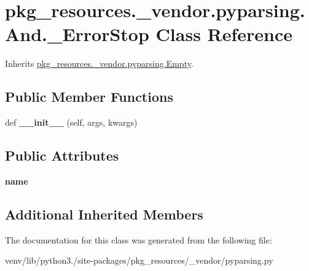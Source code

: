 \hypertarget{classpkg__resources_1_1__vendor_1_1pyparsing_1_1_and_1_1___error_stop}{}\section{pkg\+\_\+resources.\+\_\+vendor.\+pyparsing.\+And.\+\_\+\+Error\+Stop Class Reference}
\label{classpkg__resources_1_1__vendor_1_1pyparsing_1_1_and_1_1___error_stop}


Inherits \hyperlink{classpkg__resources_1_1__vendor_1_1pyparsing_1_1_empty}{pkg\+\_\+resources.\+\_\+vendor.\+pyparsing.\+Empty}.

\subsection*{Public Member Functions}
\begin{DoxyCompactItemize}
\item 
\mbox{\label{classpkg__resources_1_1__vendor_1_1pyparsing_1_1_and_1_1___error_stop_a332d54174e10c8ecf9c328ba395cab14}} 
def {\bfseries \+\_\+\+\_\+init\+\_\+\+\_\+} (self, args, kwargs)
\end{DoxyCompactItemize}
\subsection*{Public Attributes}
\begin{DoxyCompactItemize}
\item 
\mbox{\label{classpkg__resources_1_1__vendor_1_1pyparsing_1_1_and_1_1___error_stop_a424f6e8180b4d33396c48f8bca657631}} 
{\bfseries name}
\end{DoxyCompactItemize}
\subsection*{Additional Inherited Members}


The documentation for this class was generated from the following file\+:\begin{DoxyCompactItemize}
\item 
venv/lib/python3./site-\/packages/pkg\+\_\+resources/\+\_\+vendor/pyparsing.\+py\end{DoxyCompactItemize}
